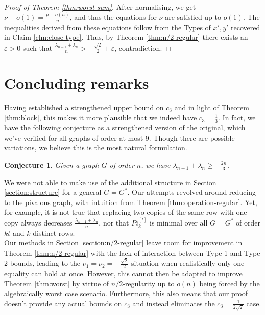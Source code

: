 \documentclass[11pt]{article}
\newtheorem{cnj}[thm]{Conjecture}
\begin{document}
\begin{proof}[Proof of Theorem \ref{thm:worst-sum}]
    After normalising, we get $\nu + o(1) = \frac{\mu + o(n)}{n}$, and thus the equations for $\nu$ are satisfied up to $o(1)$. The inequalities derived from these equations follow from the Types of $x', y'$ recovered in Claim \ref{clm:close-type}. Thus, by Theorem \ref{thm:n/2-regular} there exists an $\varepsilon > 0$ such that $\frac{\lambda_{n-1} + \lambda_n}{n} > -\frac{\sqrt{2}}{2} + \varepsilon$, contradiction. 
\end{proof}

\section{Concluding remarks}

Having established a strengthened upper bound on $c_3$ and in light of Theorem \ref{thm:block}, this makes it more plausible that we indeed have $c_3 = \frac13$. In fact, we have the following conjecture as a strengthened version of the original, which we've verified for all graphs of order at most 9. Though there are possible variations, we believe this is the most natural formulation.

\begin{cnj}\label{cnj:sum}
    Given a graph $G$ of order $n$, we have $\lambda_{n-1} + \lambda_n \ge -\frac{2n}{3}$. 
\end{cnj}

We were not able to make use of the additional structure in Section \ref{section:structure} for a general $G = G^*$. Our attempts revolved around reducing to the pivalous graph, with intuition from Theorem \ref{thm:operation-regular}. Yet, for example, it is not true that replacing two copies of the same row with one copy always decreases $\frac{\lambda_{n-1} + \lambda_n}{n}$, nor that $Pi_k^{[t]}$ is minimal over all $G = G^*$ of order $kt$ and $k$ distinct rows. \\

Our methods in Section \ref{section:n/2-regular} leave room for improvement in Theorem \ref{thm:n/2-regular} with the lack of interaction between Type 1 and Type 2 bounds, leading to the $\nu_1 = \nu_2 = -\frac{\sqrt{2}}{2}$ situation when realistically only one equality can hold at once. However, this cannot then be adapted to improve Theorem \ref{thm:worst} by virtue of $n/2$-regularity up to $o(n)$ being forced by the algebraically worst case scenario. Furthermore, this also means that our proof doesn't provide any actual bounds on $c_3$ and instead eliminates the $c_3 = \frac{1}{2\sqrt{2}}$ case. \\
\end{document}
